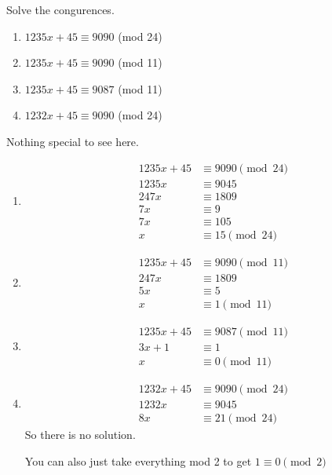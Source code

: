 \documentclass[12pt]{scrartcl}
\begin{document}
\begin{exercise}
	Solve the congurences.
	\begin{enumerate}
		\item $1235x + 45 \equiv 9090$ (mod 24)
		\item $1235x + 45 \equiv 9090$ (mod 11)
		\item $1235x + 45 \equiv 9087$ (mod 11)
		\item $1232x + 45 \equiv 9090$ (mod 24)
	\end{enumerate}
	\begin{soln} Nothing special to see here. 
		\begin{enumerate}

			\item 
				\begin{align*}
					1235x + 45 &\equiv 9090 \pmod{24} \\
					1235x &\equiv 9045 \\
					247x &\equiv 1809 \\
					7x &\equiv 9 \\
					7x &\equiv 105 \\ 
					x &\equiv 15 \pmod{24}
				\end{align*}
			\item 
				\begin{align*}
					1235x + 45 &\equiv 9090 \pmod{11} \\
					247x &\equiv 1809  \\
					5x &\equiv 5  \\
					x &\equiv 1 \pmod{11}
				\end{align*}
			\item 
				\begin{align*}
					1235x + 45 &\equiv 9087 \pmod{11} \\
					3x + 1 &\equiv 1 \\
					x &\equiv 0 \pmod{11}
				\end{align*}
			\item 
				\begin{align*}
					1232x + 45 &\equiv 9090 \pmod{24} \\
					1232x &\equiv 9045 \\
					8x &\equiv 21 \pmod{24}
				\end{align*}
				So there is no solution.
			\begin{remark*}
				You can also just take everything mod 2 to get $1 \equiv 0 \pmod{2}$
			\end{remark*}
		\end{enumerate}
	\end{soln}
\end{exercise}
\end{document}
